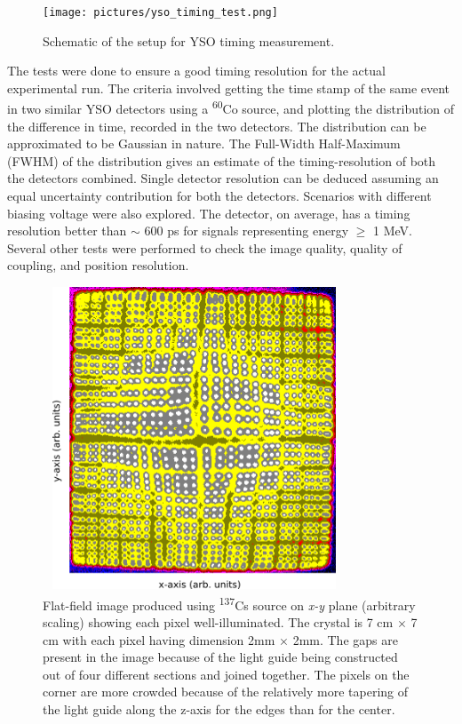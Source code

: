 \documentclass[a4paper,12pt,twoside]{report}
\begin{document}
\begin{figure}[h!]
    \centering
    \texttt{[image: pictures/yso\_timing\_test.png]}
    \caption[]{Schematic of the setup for YSO timing measurement. }
    \label{fig:timing_measurement}
\end{figure}


The tests were done to ensure a good timing resolution for the actual experimental run. The criteria involved getting the time stamp of the same event in two similar YSO detectors using a \textsuperscript{60}Co source, and plotting the distribution of the difference in time, recorded in the two detectors. The distribution can be approximated to be Gaussian in nature. The Full-Width Half-Maximum (FWHM) of the distribution gives an estimate of the timing-resolution of both the detectors combined. Single detector resolution can be deduced assuming an equal uncertainty contribution for both the detectors. Scenarios with different biasing voltage were also explored. The detector, on average, has a timing resolution better than $\sim$ 600 ps for signals representing energy $\geq$ 1 MeV. Several other tests were performed to check the image quality, quality of coupling, and position resolution. 

\begin{figure}[h!]
    \centering
    \includegraphics[width=9cm,height=9cm]{yso_inkscape1.png}
    \caption[Flat-field image produced using \textsuperscript{137}Cs source on]{Flat-field image produced using \textsuperscript{137}Cs source on \textit{x-y} plane (arbitrary scaling) showing each pixel well-illuminated. The crystal is 7 cm $\times$ 7 cm with each pixel having dimension 2mm $\times$ 2mm. The gaps are present in the image because of the light guide being constructed out of four different sections and joined together. The pixels on the corner are more crowded because of the relatively more tapering of the light guide along the z-axis for the edges than for the center.}
    \label{fig:flood_field_image}
\end{figure}
\end{document}
